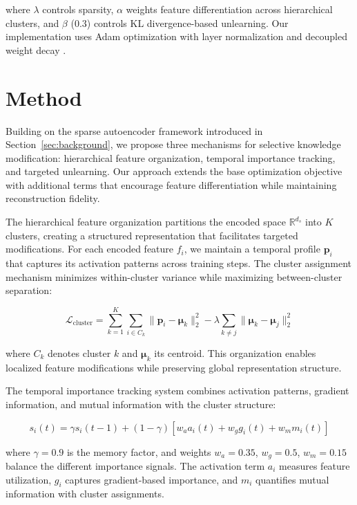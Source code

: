 \documentclass{article} %
\begin{document}
where $\lambda$ controls sparsity, $\alpha$ weights feature differentiation across hierarchical clusters, and $\beta$ (0.3) controls KL divergence-based unlearning. Our implementation uses Adam optimization \cite{kingma2014adam} with layer normalization \cite{ba2016layer} and decoupled weight decay \cite{loshchilov2017adamw}.

\section{Method}
\label{sec:method}

Building on the sparse autoencoder framework introduced in Section~\ref{sec:background}, we propose three mechanisms for selective knowledge modification: hierarchical feature organization, temporal importance tracking, and targeted unlearning. Our approach extends the base optimization objective with additional terms that encourage feature differentiation while maintaining reconstruction fidelity.

The hierarchical feature organization partitions the encoded space $\mathbb{R}^{d_s}$ into $K$ clusters, creating a structured representation that facilitates targeted modifications. For each encoded feature $f_i$, we maintain a temporal profile $\mathbf{p}_i$ that captures its activation patterns across training steps. The cluster assignment mechanism minimizes within-cluster variance while maximizing between-cluster separation:

\begin{equation}
    \mathcal{L}_{\text{cluster}} = \sum_{k=1}^K \sum_{i \in C_k} \|\mathbf{p}_i - \boldsymbol{\mu}_k\|_2^2 - \lambda \sum_{k \neq j} \|\boldsymbol{\mu}_k - \boldsymbol{\mu}_j\|_2^2
\end{equation}

where $C_k$ denotes cluster $k$ and $\boldsymbol{\mu}_k$ its centroid. This organization enables localized feature modifications while preserving global representation structure.

The temporal importance tracking system combines activation patterns, gradient information, and mutual information with the cluster structure:

\begin{equation}
    s_i(t) = \gamma s_i(t-1) + (1-\gamma)[w_a a_i(t) + w_g g_i(t) + w_m m_i(t)]
\end{equation}

where $\gamma=0.9$ is the memory factor, and weights $w_a=0.35$, $w_g=0.5$, $w_m=0.15$ balance the different importance signals. The activation term $a_i$ measures feature utilization, $g_i$ captures gradient-based importance, and $m_i$ quantifies mutual information with cluster assignments.
\end{document}
